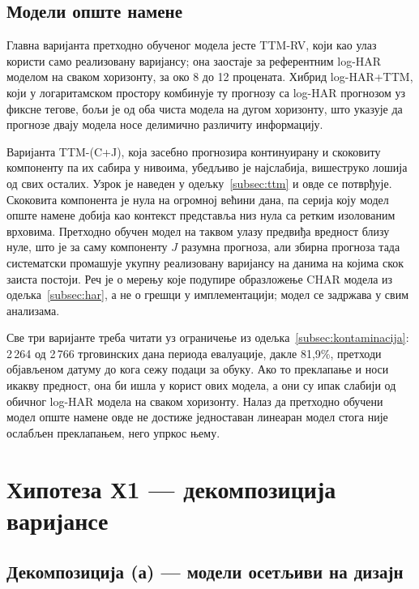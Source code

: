 \subsection{Модели опште намене}

Главна варијанта претходно обученог модела јесте TTM-RV, који као улаз користи само
реализовану варијансу; она заостаје за референтним log-HAR моделом на сваком хоризонту,
за око 8 до 12 процената. Хибрид log-HAR+TTM, који у логаритамском простору
комбинује ту прогнозу са log-HAR прогнозом уз фиксне тегове, бољи је од оба чиста модела
на дугом хоризонту, што указује да прогнозе двају модела носе делимично различиту
информацију.

Варијанта TTM-(C+J), која засебно прогнозира континуирану и скоковиту компоненту па их
сабира у нивоима, убедљиво је најслабија, вишеструко лошија од свих осталих. Узрок је
наведен у одељку~\ref{subsec:ttm} и овде се потврђује. Скоковита компонента је нула на
огромној већини дана, па серија коју модел опште намене добија као контекст представља
низ нула са ретким изолованим врховима. Претходно обучен модел на таквом улазу предвиђа
вредност близу нуле, што је за саму компоненту $J$ разумна прогноза, али збирна прогноза
тада систематски промашује укупну реализовану варијансу на данима на којима скок заиста
постоји. Реч је о мерењу које подупире образложење CHAR модела из
одељка~\ref{subsec:har}, а не о грешци у имплементацији; модел се задржава у свим
анализама.

Све три варијанте треба читати уз ограничење из одељка~\ref{subsec:kontaminacija}:
2\,264 од 2\,766 трговинских дана периода евалуације, дакле 81,9\%, претходи објављеном
датуму до кога сежу подаци за обуку. Ако то преклапање и носи икакву предност, она
би ишла у корист ових модела, а они су ипак слабији од обичног log-HAR модела на сваком
хоризонту. Налаз да претходно обучени модел опште намене овде не достиже једноставан
линеаран модел стога није ослабљен преклапањем, него упркос њему.

\section{Хипотеза Х1 — декомпозиција варијансе}
\label{sec:rez-h1}

\subsection{Декомпозиција (а) — модели осетљиви на дизајн}

